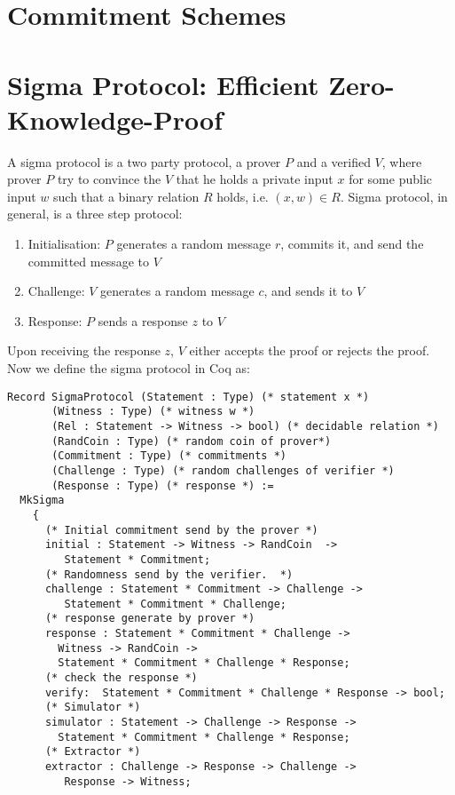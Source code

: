 \begin{Definition}
\begin{verbatim}
\end{verbatim}

\section{Commitment Schemes}


\section{Sigma Protocol: Efficient Zero-Knowledge-Proof}
A sigma protocol is a two party protocol, a prover $P$ and a verified $V$, where prover $P$ try to convince the $V$ that he 
holds a private input $x$ for some public input $w$ such that a binary relation $R$ holds, i.e. $(x, w) \in R$.  Sigma protocol, 
in general, is a three step protocol:
\begin{enumerate}
\item Initialisation: $P$ generates a random message $r$, commits it, and send the committed message to $V$
\item Challenge: $V$ generates a random message $c$, and sends it to $V$
\item Response: $P$ sends a response $z$ to $V$
\end{enumerate} 

\noindent
Upon receiving the response $z$, $V$ either accepts the proof or rejects the proof.  Now we define the sigma protocol in 
Coq as:
\begin{verbatim}
Record SigmaProtocol (Statement : Type) (* statement x *)
       (Witness : Type) (* witness w *)
       (Rel : Statement -> Witness -> bool) (* decidable relation *)
       (RandCoin : Type) (* random coin of prover*) 
       (Commitment : Type) (* commitments *)
       (Challenge : Type) (* random challenges of verifier *) 
       (Response : Type) (* response *) :=
  MkSigma 
    {
      (* Initial commitment send by the prover *)
      initial : Statement -> Witness -> RandCoin  -> 
         Statement * Commitment;
      (* Randomness send by the verifier.  *)     
      challenge : Statement * Commitment -> Challenge -> 
         Statement * Commitment * Challenge;
      (* response generate by prover *)
      response : Statement * Commitment * Challenge -> 
        Witness -> RandCoin -> 
        Statement * Commitment * Challenge * Response; 
      (* check the response *)
      verify:  Statement * Commitment * Challenge * Response -> bool;
      (* Simulator *)
      simulator : Statement -> Challenge -> Response ->
        Statement * Commitment * Challenge * Response;
      (* Extractor *)
      extractor : Challenge -> Response -> Challenge -> 
         Response -> Witness;
      

\end{verbatim}
\end{Definition}
